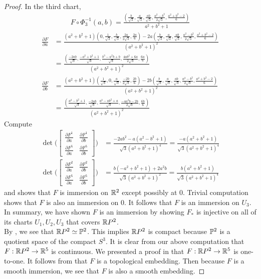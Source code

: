 \documentclass{report}
\begin{document}
\begin{proof}
In the third chart, 
\begin{align*}
F\circ \Phi_3^{-1}(a,b)= \frac{(\frac{b}{\sqrt{3} }, \frac{a}{\sqrt{3} }, \frac{ab}{\sqrt{3} }, \frac{a^2-b^2}{2\sqrt{3} }, \frac{a^2+b^2-2}{6 })}{a^2+b^2+1}
\end{align*}
\begin{align*}
\frac{\partial F}{\partial a}&= \frac{(a^2+b^2+1)(0,\frac{1}{\sqrt{3} }, \frac{b}{\sqrt{3} }, \frac{2a}{2\sqrt{3} }, \frac{2a}{6 })-2a(\frac{b}{\sqrt{3} }, \frac{a}{\sqrt{3} }, \frac{ab}{\sqrt{3} }, \frac{a^2-b^2}{2\sqrt{3} }, \frac{a^2+b^2-2}{6 })}{(a^2+b^2+1)^2} \\
&=\frac{(\frac{-2ab}{\sqrt{3} }, \frac{-a^2+b^2+1}{\sqrt{3} },\frac{b^3-a^2b+b}{\sqrt{3} },\frac{4ab^2+6a}{2\sqrt{3} }, \frac{6a}{6})}{(a^2+b^2+1)^2} \\
\frac{\partial F}{\partial b}&= \frac{(a^2+b^2+1)(\frac{1}{\sqrt{3} },0, \frac{a}{\sqrt{3} },\frac{-2b}{2\sqrt{3} }, \frac{2b}{6})-2b(\frac{b}{\sqrt{3} }, \frac{a}{\sqrt{3} }, \frac{ab}{\sqrt{3} }, \frac{a^2-b^2}{2\sqrt{3} }, \frac{a^2+b^2-2}{6 }) }{(a^2+b^2+1)^2} \\
&=\frac{(\frac{a^2-b^2+1}{\sqrt{3} }, \frac{-2ab}{\sqrt{3} }, \frac{a^3-ab^2+a}{\sqrt{3} }, \frac{-4a^2b-2b}{2\sqrt{3} }, \frac{6b}{6})}{(a^2+b^2+1)^2}
\end{align*}
Compute 
\begin{align}
\label{mi8}
\operatorname{det}\Big( \begin{bmatrix}
    \frac{\partial F^1}{\partial a} & \frac{\partial F^1}{\partial b} \\
    \frac{\partial F^5}{\partial a} & \frac{\partial F^5}{\partial b}
\end{bmatrix} \Big)&= \frac{-2ab^2 -a(a^2-b^2+1)}{\sqrt{3} (a^2+b^2+1)^4}= \frac{-a(a^2+b^2+1)}{\sqrt{3}(a^2+b^2+1)^4 } \\
\label{mi9}
\operatorname{det}\Big(\begin{bmatrix}
    \frac{\partial F^2}{\partial a} & \frac{\partial F^2}{\partial  b}\\
    \frac{\partial F^5}{\partial a} & \frac{\partial F^5}{\partial b}
\end{bmatrix} \Big)&= \frac{b(-a^2+b^2+1)+2a^2b}{\sqrt{3}(a^2+b^2+1)^2 }= \frac{b(a^2+b^2+1)}{\sqrt{3}(a^2+b^2+1)^4 }
\end{align} 
 and  shows that $F$ is immersion on $\R^2$ except possibly at  $0$. Trivial computation shows that  $F$ is also an immersion on $0$. It follows that $F$ is an immersion on  $U_3$. In summary, we have shown $F$ is an immersion by showing  $F_*$ is injective on all of its charts $U_1,U_2,U_3$ that covers $\R P^2$.\\

By , we see that $\R P^2 \simeq \P^2$. This implies $\R P^2$ is compact because  $\P^2$ is a quotient space of the compact $S^3$. It is clear from our above computation that $F:\R P^2\rightarrow \R^5$ is continuous. We presented a proof in  that $F:\R P^2\rightarrow \R^5$ is one-to-one. It follows from  that $F$ is a topological embedding. Then because $F$ is a smooth immersion, we see that  $F$ is also a smooth embedding.  
\end{proof}
\end{document}
